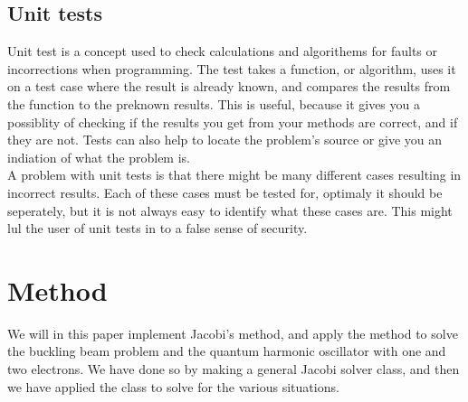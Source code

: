 \documentclass[%
reprint,
amsmath, 
amssymb, 
aps,]{revtex4-1}
\begin{document}
		\subsection{Unit tests}
Unit test is a concept used to check calculations and algorithems for faults or incorrections when programming. The test takes a function, or algorithm, uses it on a test case where the result is already known, and compares the results from the function to the preknown results. This is useful, because it gives you a possiblity of checking if the results you get from your methods are correct, and if they are not. Tests can also help to locate the problem's source or give you an indiation of what the problem is. \\

A problem with unit tests is that there might be many different cases resulting in incorrect results. Each of these cases must be tested for, optimaly it should be seperately, but it is not always easy to identify what these cases are. This might lul the user of unit tests in to a false sense of security.

\newpage 

	\section*{Method} \noindent 
We will in this paper implement Jacobi's method, and apply the method to solve the buckling beam problem and the quantum harmonic oscillator with one and two electrons. We have done so by making a general Jacobi solver class, and then we have applied the class to solve for the various situations. 
\end{document}

